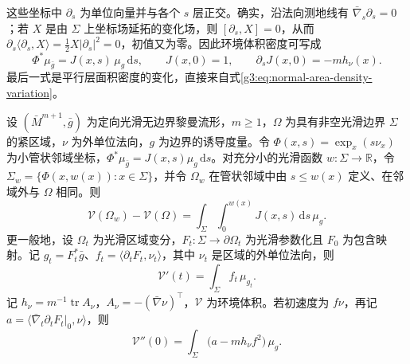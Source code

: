 \ProseParagraphBreak

这些坐标中 \(\partial_s\) 为单位向量并与各个 \(s\) 层正交。确实，沿法向测地线有 \(\bar\nabla_s\partial_s=0\)；若 \(X\) 是由 \(\Sigma\) 上坐标场延拓的变化场，则 \([\partial_s,X]=0\)，从而
\(\partial_s\langle\partial_s,X\rangle=\frac12X|\partial_s|^2=0\)，初值又为零。因此环境体积密度可写成
\[
	\Phi^*\mu_{\bar g}=J(x,s)\,\mu_g\,\mathrm ds,
	\qquad J(x,0)=1,
	\qquad \partial_sJ(x,0)=-m h_\nu(x).
\]
最后一式是平行层面积密度的变化，直接来自式\eqref{g3:eq:normal-area-density-variation}。

\begin{proposition}\label{g3:prop:enclosed-volume-first-variation}
	设 \((\bar M^{m+1},\bar g)\) 为定向光滑无边界黎曼流形，\(m\ge1\)，\(\Omega\) 为具有非空光滑边界 \(\Sigma\) 的紧区域，\(\nu\) 为外单位法向，\(g\) 为边界的诱导度量。令 \(\Phi(x,s)=\exp_x(s\nu_x)\) 为小管状邻域坐标，\(\Phi^*\mu_{\bar g}=J(x,s)\mu_g\,\mathrm ds\)。对充分小的光滑函数 \(w:\Sigma\to\mathbb R\)，令 \(\Sigma_w=\{\Phi(x,w(x)):x\in\Sigma\}\)，并令 \(\Omega_w\) 在管状邻域中由 \(s\le w(x)\) 定义、在邻域外与 \(\Omega\) 相同。则
	\begin{equation}\label{g3:eq:normal-graph-volume}
		\mathcal V(\Omega_w)-\mathcal V(\Omega)
		=\int_\Sigma\int_0^{w(x)}J(x,s)\,\mathrm ds\,\mu_g.
	\end{equation}
	更一般地，设 \(\Omega_t\) 为光滑区域变分，\(F_t:\Sigma\to\partial\Omega_t\) 为光滑参数化且 \(F_0\) 为包含映射。记 \(g_t=F_t^*\bar g\)、\(f_t=\langle\partial_tF_t,\nu_t\rangle\)，其中 \(\nu_t\) 是区域的外单位法向，则
	\begin{equation}\label{g3:eq:enclosed-volume-first-variation}
		\mathcal V'(t)=\int_\Sigma f_t\,\mu_{g_t}.
	\end{equation}
	记 \(h_\nu=m^{-1}\operatorname{tr}A_\nu\)，\(A_\nu=-(\bar\nabla\nu)^\top\)，\(\mathcal V\) 为环境体积。若初速度为 \(f\nu\)，再记 \(a=\langle\bar\nabla_t\partial_tF_t|_0,\nu\rangle\)，则
	\begin{equation}\label{g3:eq:enclosed-volume-second-variation}
		\mathcal V''(0)=\int_\Sigma\bigl(a-m h_\nu f^2\bigr)\,\mu_g.
	\end{equation}
\end{proposition}
